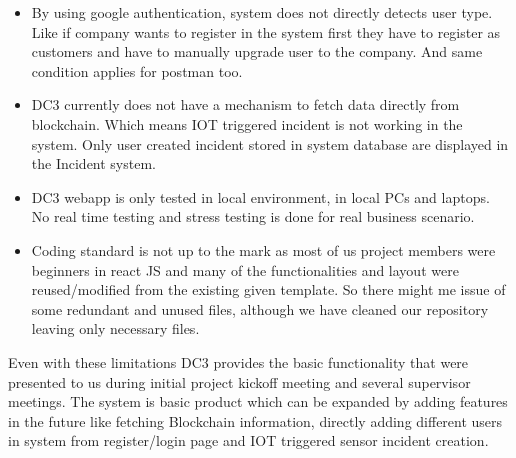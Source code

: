 \begin{itemize}
\item By using google authentication, system does not  directly detects user type. Like if company wants to register in the system first they have to register as customers and have to manually upgrade user to the company. And same condition applies for postman too.
\end{itemize}
\begin{itemize}
\item DC3 currently does not have a mechanism to fetch data directly from blockchain. Which means IOT triggered incident is not working in the system. Only user created incident stored in system database are displayed in the Incident system.
\item DC3 webapp is only tested in local environment, in local PCs and laptops. No real time testing and stress testing is done for real business scenario.
\end{itemize}
\begin{itemize}
\item Coding standard is not up to the mark as most of us project members were beginners in react JS and many of the functionalities and layout were reused/modified from the existing given template. So there might me issue of some redundant and unused files, although we have cleaned our repository leaving only necessary files.
\end{itemize}
Even with these limitations DC3 provides the basic functionality that were presented to us during initial project kickoff meeting and several supervisor meetings. The system is basic product which can be expanded by adding features in the future like fetching Blockchain information, directly adding different users  in system from register/login page and  IOT triggered sensor incident creation.